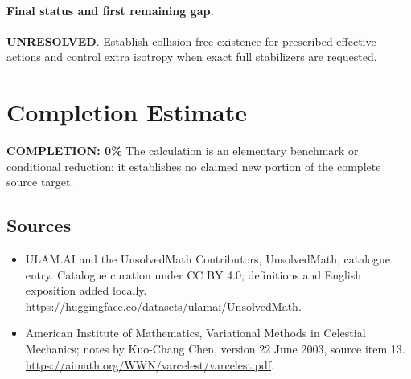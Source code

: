 \documentclass[11pt]{article}
\begin{document}
\paragraph{Final status and first remaining gap.}
\textbf{UNRESOLVED}. Establish collision-free existence for prescribed effective actions and control extra isotropy when exact full stabilizers are requested.

\section{Completion Estimate}
\noindent\textbf{COMPLETION: 0\%}
The calculation is an elementary benchmark or conditional reduction; it establishes no claimed new portion of the complete source target.

\subsection{Sources}
\begin{itemize}
\item[\hypertarget{source:statement:1}{S1}] ULAM.AI and the UnsolvedMath Contributors, UnsolvedMath, catalogue entry. Catalogue curation under CC BY 4.0; definitions and English exposition added locally.
\url{https://huggingface.co/datasets/ulamai/UnsolvedMath}.
\item[\hypertarget{source:statement:2}{S2}] American Institute of Mathematics, Variational Methods in Celestial Mechanics; notes by Kuo-Chang Chen, version 22 June 2003, source item 13.
\url{https://aimath.org/WWN/varcelest/varcelest.pdf}.
\end{itemize}
\label{end:statement}
\end{document}
